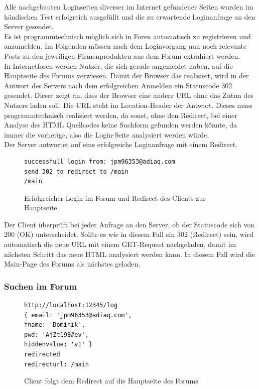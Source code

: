 Alle nachgebauten Loginseiten diverser im Internet gefundener Seiten wurden im händischen Test erfolgreich ausgefüllt und die zu erwartende Loginanfrage an den Server gesendet.\\
Es ist programmtechnisch möglich sich in Foren automatisch zu registrieren und anzumelden. Im Folgenden müssen nach dem Loginvorgang nun noch relevante Posts zu den jeweiligen Firmenprodukten aus dem Forum extrahiert werden.\\
In Internetforen werden Nutzer, die sich gerade angemeldet haben, auf die Hauptseite des Forums verwiesen. Damit der Browser das realisiert, wird in der Antwort des Servers nach dem erfolgreichen Anmelden ein Statuscode 302 gesendet. Dieser zeigt an, dass der Browser eine andere URL ohne das Zutun des Nutzers laden soll. Die URL steht im Location-Header der Antwort. Dieses muss programmtechnisch realisiert werden, da sonst, ohne den Redirect, bei einer Analyse des HTML Quellcodes keine Suchform gefunden werden könnte, da immer die vorherige, also die Login-Seite analysiert werden würde.\\
Der Server antwortet auf eine erfolgreiche Loginanfrage mit einem Redirect.

\begin{figure}[ht]
\begin{lstlisting}[language=HTML5]
successfull login from: jpm96353@adiaq.com
send 302 to redirect to /main
/main
\end{lstlisting}
\caption{Erfolgreicher Login im Forum und Redirect des Clients zur Hauptseite}
\end{figure}

Der Client überprüft bei jeder Anfrage an den Server, ob der Statuscode sich von 200 (OK) unterscheidet. Sollte es wie in diesem Fall ein 302 (Redirect) sein, wird automatisch die neue URL mit einem GET-Request nachgeladen, damit im nächsten Schritt das neue HTML analysiert werden kann. In diesem Fall wird die Main-Page des Forums als nächstes geladen.

\newpage

\subsubsection{Suchen im Forum}

\begin{figure}[ht]
\begin{lstlisting}[language=HTML5]
http://localhost:12345/log
{ email: 'jpm96353@adiaq.com',
fname: 'Dominik',
pwd: 'AjZt198#ev',
hiddenvalue: 'v1' }
redirected
redirecturl: /main
\end{lstlisting}
\caption{Client folgt dem Redirect auf die Hauptseite des Forums}
\end{figure}

